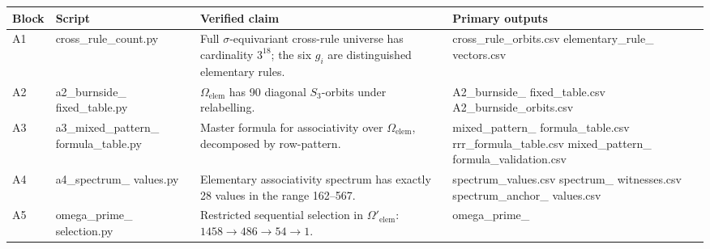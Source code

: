 \documentclass[11pt]{article}
\begin{document}
\begin{center}
\scriptsize
\setlength{\tabcolsep}{4pt}
\begin{longtable}{@{}p{}p{}p{}p{}@{}}
\toprule
Block & Script & Verified claim & Primary outputs \\
\midrule
A1 &
{\ttfamily cross\_rule\_count.py} &
Full \(\sigma\)-equivariant cross-rule universe has cardinality \(3^{18}\); the six \(g_i\) are distinguished elementary rules. &
{\ttfamily cross\_rule\_orbits.csv}\newline
{\ttfamily elementary\_rule\_}\newline
{\ttfamily vectors.csv} \\
\addlinespace
A2 &
{\ttfamily a2\_burnside\_}\newline
{\ttfamily fixed\_table.py} &
\(\Omega_{\mathrm{elem}}\) has 90 diagonal \(S_3\)-orbits under relabelling. &
{\ttfamily A2\_burnside\_}\newline
{\ttfamily fixed\_table.csv}\newline
{\ttfamily A2\_burnside\_orbits.csv} \\
\addlinespace
A3 &
{\ttfamily a3\_mixed\_pattern\_}\newline
{\ttfamily formula\_table.py} &
Master formula for associativity over \(\Omega_{\mathrm{elem}}\), decomposed by row-pattern. &
{\ttfamily mixed\_pattern\_}\newline
{\ttfamily formula\_table.csv}\newline
{\ttfamily rrr\_formula\_table.csv}\newline
{\ttfamily mixed\_pattern\_}\newline
{\ttfamily formula\_validation.csv} \\
\addlinespace
A4 &
{\ttfamily a4\_spectrum\_}\newline
{\ttfamily values.py} &
Elementary associativity spectrum has exactly 28 values in the range 162--567. &
{\ttfamily spectrum\_values.csv}\newline
{\ttfamily spectrum\_}\newline
{\ttfamily witnesses.csv}\newline
{\ttfamily spectrum\_anchor\_}\newline
{\ttfamily values.csv} \\
\addlinespace
A5 &
{\ttfamily omega\_prime\_}\newline
{\ttfamily selection.py} &
Restricted sequential selection in \(\Omega'_{\mathrm{elem}}\): \(1458\to486\to54\to1\). &
{\ttfamily omega\_prime\_}\newline

\end{longtable}
\end{center}
\end{document}
